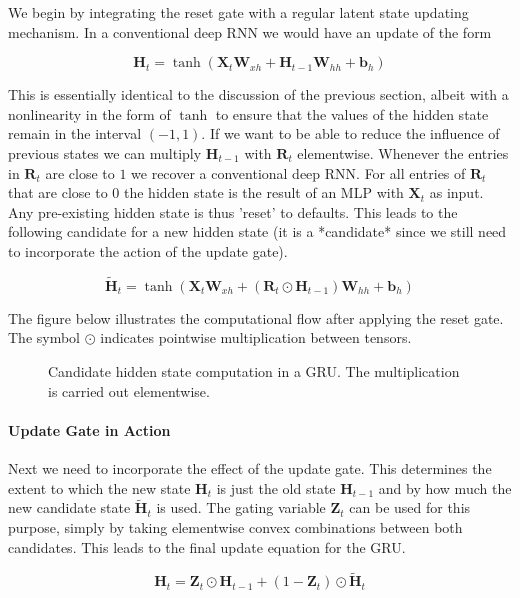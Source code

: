 We begin by integrating the reset gate with a regular latent state updating mechanism. In a conventional deep RNN we would have an update of the form

$$\mathbf{H}_t = \tanh(\mathbf{X}_t \mathbf{W}_{xh} + \mathbf{H}_{t-1}\mathbf{W}_{hh} + \mathbf{b}_h)$$

This is essentially identical to the discussion of the previous section, albeit with a nonlinearity in the form of $\tanh$ to ensure that the values of the hidden state remain in the interval $(-1, 1)$.
If we want to be able to reduce the influence of previous states we can multiply $\mathbf{H}_{t-1}$ with $\mathbf{R}_t$ elementwise. Whenever the entries in $\mathbf{R}_t$ are close to $1$ we recover a conventional deep RNN. For all entries of $\mathbf{R}_t$ that are close to $0$ the hidden state is the result of an MLP with $\mathbf{X}_t$ as input. Any pre-existing hidden state is thus 'reset' to defaults. This leads to the following candidate for a new hidden state (it is a *candidate* since we still need to incorporate the action of the update gate).

$$\tilde{\mathbf{H}}_t = \tanh(\mathbf{X}_t \mathbf{W}_{xh} + \left(\mathbf{R}_t \odot \mathbf{H}_{t-1}\right) \mathbf{W}_{hh} + \mathbf{b}_h)$$

The figure below illustrates the computational flow after applying the reset gate. The symbol $\odot$ indicates pointwise multiplication between tensors.

\begin{figure}[hpt]
	\centering
	
	\caption{Candidate hidden state computation in a GRU. The multiplication is carried out elementwise.}
	\label{fig:gru_2}
\end{figure}

\paragraph{Update Gate in Action}

Next we need to incorporate the effect of the update gate. This determines the extent to which the new state $\mathbf{H}_t$ is just the old state $\mathbf{H}_{t-1}$ and by how much the new candidate state $\tilde{\mathbf{H}}_t$ is used. The gating variable $\mathbf{Z}_t$ can be used for this purpose, simply by taking elementwise convex combinations between both candidates. This leads to the final update equation for the GRU.

$$\mathbf{H}_t = \mathbf{Z}_t \odot \mathbf{H}_{t-1}  + (1 - \mathbf{Z}_t) \odot \tilde{\mathbf{H}}_t$$

